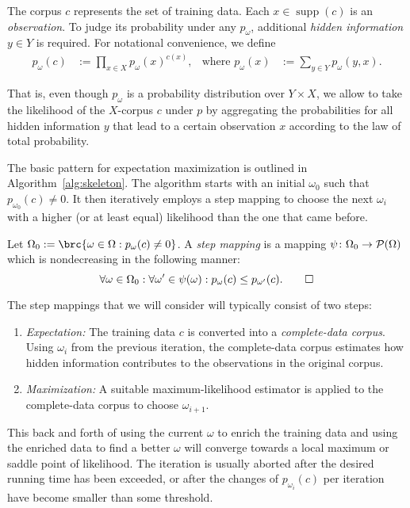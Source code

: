 The corpus $c$ represents the set of training data. Each $x\in\operatorname{supp}(c)$ is
an \emph{observation}. To judge its probability under any $p_\omega$, additional
\emph{hidden information} $y\in Y$ is required. For notational convenience, we define
\begin{align*}
 p_\omega(c) &:= \prod_{x\in X} p_\omega(x)^{c(x)}, &
 \text{where } p_\omega(x) &:= \sum_{y\in Y} p_\omega(y,x).
\end{align*}

That is, even though $p_\omega$ is a probability distribution over $Y\times X$,
we allow to take the likelihood of the $X$-corpus $c$ under $p$ by aggregating
the probabilities for all hidden information $y$ that lead to a certain
observation $x$ according to the law of total probability.

The basic pattern for expectation maximization is outlined in
Algorithm~\ref{alg:skeleton}. The algorithm starts with an initial $\omega_0$
such that $p_{\omega_0}(c) \neq 0$. It then iteratively employs a step mapping
to choose the next $\omega_i$ with a higher (or at least equal) likelihood than
the one that came before.

\begin{definition}
 Let $\Omega_0 := \brc{\omega\in\Omega: p_\omega(c) \neq 0}$. A \emph{step
 mapping} is a mapping $\psi\colon\Omega_0\to\mathcal P(\Omega)$ which is nondecreasing in
 the following manner:
 \[
  \forall \omega\in\Omega_0: \forall \omega'\in\psi(\omega): p_\omega(c) \leq p_{\omega'}(c). \qedhere
 \]
\end{definition}

The step mappings that we will consider will typically consist of two steps:
\begin{enumerate}
 \item \emph{Expectation:} The training data $c$ is converted into a
  \emph{complete-data corpus}. Using $\omega_i$ from the previous
  iteration, the complete-data corpus estimates how hidden information
  contributes to the observations in the original corpus.
 \item \emph{Maximization:} A suitable maximum-likelihood estimator is applied
  to the complete-data corpus to choose $\omega_{i+1}$.
\end{enumerate}

This back and forth of using the current $\omega$ to enrich the training data
and using the enriched data to find a better $\omega$ will converge towards a
local maximum or saddle point of likelihood. The iteration is usually
aborted after the desired running time has been exceeded, or after the changes
of $p_{\omega_i}(c)$ per iteration have become smaller than some threshold.

